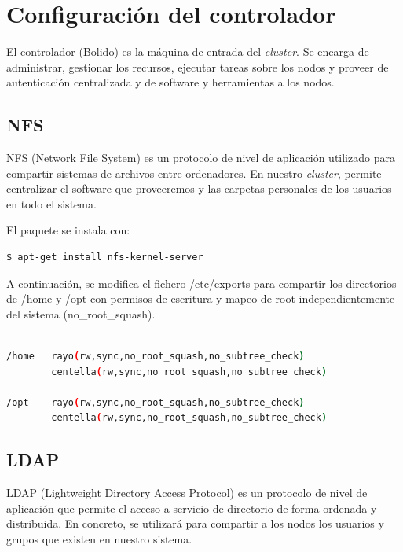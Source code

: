 \section{Configuración del controlador}

El controlador (Bolido) es la máquina de entrada del \emph{cluster}. Se encarga de administrar, gestionar los recursos, ejecutar tareas sobre los nodos y proveer de autenticación centralizada y de software y herramientas a los nodos.

\subsection{NFS}

NFS \cite{nfs} (Network File System) es un protocolo de nivel de aplicación utilizado para compartir sistemas de archivos entre ordenadores. En nuestro \emph{cluster}, permite centralizar el software que proveeremos y las carpetas personales de los usuarios en todo el sistema.
\vspace{4mm}

El paquete se instala con:
\begin{lstlisting}[language=bash]
    $ apt-get install nfs-kernel-server 
\end{lstlisting}
\vspace{4mm}

A continuación, se modifica el fichero /etc/exports para compartir los directorios de /home y /opt con permisos de escritura y mapeo de root independientemente del sistema (no\_root\_squash).
\vspace{2mm}

\begin{lstlisting}[language=bash,caption={Fichero /etc/exports de Bolido}]

/home	rayo(rw,sync,no_root_squash,no_subtree_check)
        centella(rw,sync,no_root_squash,no_subtree_check)
        
/opt	rayo(rw,sync,no_root_squash,no_subtree_check)
        centella(rw,sync,no_root_squash,no_subtree_check)
\end{lstlisting}

\subsection{LDAP}

LDAP (Lightweight Directory Access Protocol) \cite{ldap} es un protocolo de nivel de aplicación que permite el acceso a servicio de directorio de forma ordenada y distribuida. En concreto, se utilizará para compartir a los nodos los usuarios y grupos que existen en nuestro sistema.

